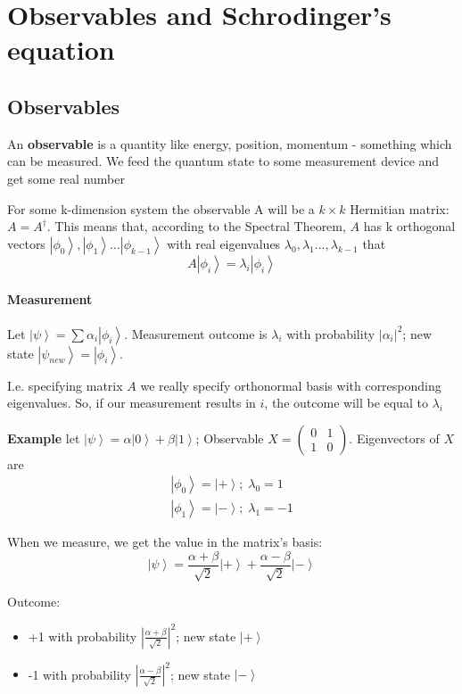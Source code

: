 \documentclass{scrartcl}
\newcommand{\ket}[1]{\left| #1 \right>} %
\begin{document}
\section{Observables and Schrodinger's equation}
\label{sec:8}

\subsection{Observables}
\label{sec:7-1}

An {\bf observable } is a quantity like energy, position, momentum - something
which can be measured. We feed the quantum state to some measurement device and
get some real number

For some k-dimension system the observable A will be a $k \times k$ Hermitian
matrix: $A = A^\dag$. This means that, according to the Spectral Theorem, $A$
has k orthogonal vectors $\ket{\phi_0}, \ket{\phi_1} \dots \ket{\phi_{k-1}}$
with real eigenvalues $\lambda_0, \lambda_1 \dots, \lambda_{k-1}$ that
$$A \ket{\phi_i} = \lambda_i \ket{\phi_i}$$

\paragraph{Measurement}

Let $\ket\psi = \sum \alpha_i\ket{\phi_i}$. Measurement outcome is $\lambda_i$
with probability $|\alpha_i|^2$; new state $\ket{\psi_{new}} = \ket{\phi_i}$.

I.e. specifying matrix $A$ we really specify orthonormal basis with
corresponding eigenvalues. So, if our measurement results in $i$, the outcome
will be equal to $\lambda_i$

{\bf Example} let $\ket\psi = \alpha \ket0 + \beta\ket1$; Observable $X
= \begin{pmatrix} 0 & 1 \\ 1 & 0 \end{pmatrix}$. Eigenvectors of $X$ are
\begin{gather*} \ket{\phi_0} = \ket+; \; \lambda_0 = 1 \\ \ket{\phi_1} = \ket-;
  \; \lambda_1 = -1 \end{gather*}

When we measure, we get the value in the matrix's basis: $$\ket\psi =
\frac{\alpha + \beta}{\sqrt2} \ket+ + \frac{\alpha-\beta}{\sqrt2} \ket-$$

Outcome:
\begin{itemize}
\item +1 with probability $\left| \frac{\alpha + \beta}{\sqrt2}\right| ^2$; new
  state $\ket+$
\item -1 with probability $\left| \frac{\alpha - \beta}{\sqrt2}\right| ^2$; new
  state $\ket-$
\end{itemize}
\end{document}
